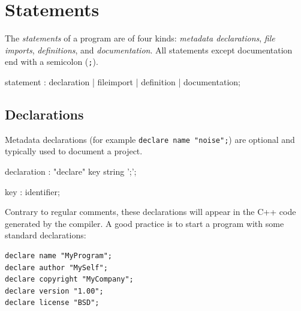 \section{Statements}

The \textit{statements} of a \faust program are of four kinds: \textit{metadata declarations}, \textit{file imports}, \textit{definitions}, and \textit{documentation}. All statements except documentation end with a semicolon (\lstinline';'). 
% 

\begin{rail}
statement : declaration | fileimport | definition | documentation;
\end{rail}

\subsection{Declarations}

Metadata declarations (for example \lstinline'declare name "noise";') are optional and typically used to document a \faust project. 

% 

\begin{rail}
declaration : "declare" key string ';';
\end{rail}

\begin{rail}
key : identifier;
\end{rail}

Contrary to regular comments, these declarations will appear in the C++ code generated by the compiler. A good practice is to start a \faust program with some standard declarations:
\begin{lstlisting}
declare name "MyProgram";
declare author "MySelf";
declare copyright "MyCompany";
declare version "1.00";
declare license "BSD"; 
\end{lstlisting}

